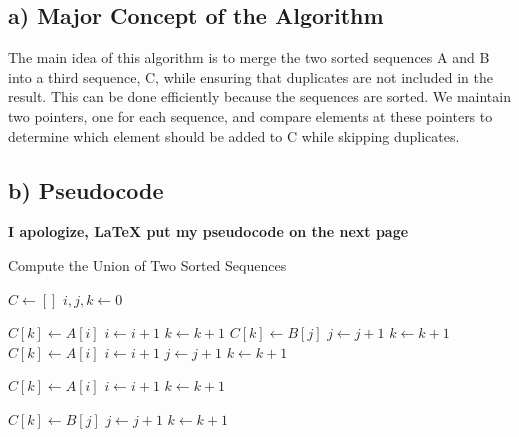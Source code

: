 \documentclass[12pt, letterpaper]{article}
\begin{document}
\subsection{a) Major Concept of the Algorithm}
   The main idea of this algorithm is to merge the two sorted sequences A and B into a third sequence, C, while ensuring that duplicates are not included in the result. This can be done efficiently because the sequences are sorted. We maintain two pointers, one for each sequence, and compare elements at these pointers to determine which element should be added to C while skipping duplicates.

\subsection{b) Pseudocode}
\textbf{I apologize, LaTeX put my pseudocode on the next page}
\begin{algorithm}
\caption{Compute the Union of Two Sorted Sequences}
\label{alg:union}
\begin{algorithmic}[H]
\State $C \gets []$
\State $i,j,k \gets 0$

        \State $C[k] \gets A[i]$
        \State $i \gets i+1$
        \State $k \gets k+1$
        \State $C[k] \gets B[j]$
        \State $j \gets j+1$
        \State $k \gets k+1$
    \Else
        \State {}
        \State $C[k] \gets A[i]$
        \State $i \gets i+1$
        \State $j \gets j+1$
        \State $k \gets k+1$
    \EndIf
\EndWhile

    \State $C[k] \gets A[i]$
    \State $i \gets i+1$
    \State $k \gets k+1$
\EndWhile

    \State $C[k] \gets B[j]$
    \State $j \gets j+1$
    \State $k \gets k+1$
\EndWhile

\end{algorithmic}
\end{algorithm}
\end{document}
